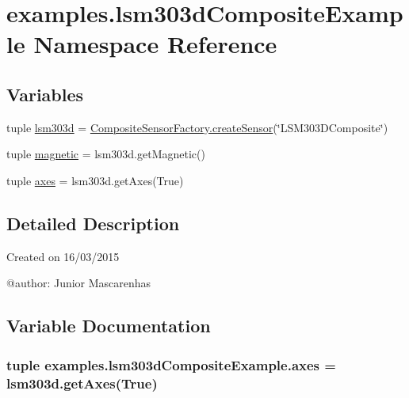 \hypertarget{namespaceexamples_1_1lsm303dCompositeExample}{}\section{examples.\+lsm303d\+Composite\+Example Namespace Reference}
\label{namespaceexamples_1_1lsm303dCompositeExample}
\subsection*{Variables}
\begin{DoxyCompactItemize}
\item 
tuple \hyperlink{namespaceexamples_1_1lsm303dCompositeExample_ad02f156b63785510a1bfe08ad8ce3e12}{lsm303d} = \hyperlink{classconcretefactory_1_1compositeSensorFactory_1_1CompositeSensorFactory_a2d3860525907a2f2d37c98163150ea03}{Composite\+Sensor\+Factory.\+create\+Sensor}(\char`\"{}L\+S\+M303\+D\+Composite\char`\"{})
\item 
tuple \hyperlink{namespaceexamples_1_1lsm303dCompositeExample_a307ea9829e8bd013e8071040bd91772e}{magnetic} = lsm303d.\+get\+Magnetic()
\item 
tuple \hyperlink{namespaceexamples_1_1lsm303dCompositeExample_a3fb6d4c45ee08c132671c8376e9c2cb7}{axes} = lsm303d.\+get\+Axes(True)
\end{DoxyCompactItemize}


\subsection{Detailed Description}
\begin{DoxyVerb}Created on 16/03/2015

@author: Junior Mascarenhas
\end{DoxyVerb}
 

\subsection{Variable Documentation}
\hypertarget{namespaceexamples_1_1lsm303dCompositeExample_a3fb6d4c45ee08c132671c8376e9c2cb7}{}
\subsubsection[{axes}]{\setlength{\rightskip}{0pt plus 5cm}tuple examples.\+lsm303d\+Composite\+Example.\+axes = lsm303d.\+get\+Axes(True)}\label{namespaceexamples_1_1lsm303dCompositeExample_a3fb6d4c45ee08c132671c8376e9c2cb7}
\hypertarget{namespaceexamples_1_1lsm303dCompositeExample_ad02f156b63785510a1bfe08ad8ce3e12}{}
